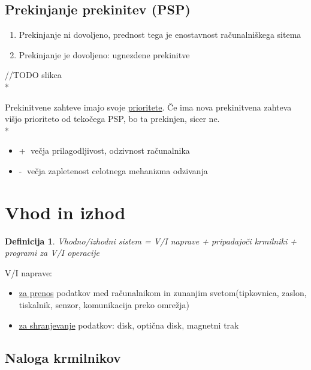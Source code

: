 \documentclass[
  slovene,
  a4paper
]{book}
\newtheorem*{df}{Definicija}
\begin{document}
\subsection{Prekinjanje prekinitev (PSP)}

\begin{enumerate}
  \item Prekinjanje ni dovoljeno, prednost tega je enostavnost računalniškega sitema
  \item Prekinjanje je dovoljeno: ugnezdene prekinitve
\end{enumerate}

//TODO slikca\\*

Prekinitvene zahteve imajo svoje \underline{prioritete}. Če ima nova prekinitvena zahteva višjo prioriteto od tekočega PSP, bo ta prekinjen, sicer ne.\\*

\begin{itemize}
  \item \textcircled{+} večja prilagodljivost, odzivnost računalnika
  \item \textcircled{-} večja zapletenost celotnega mehanizma odzivanja
\end{itemize}

\section{Vhod in izhod}

\begin{df}
  Vhodno/izhodni sistem = V/I naprave + pripadajoči krmilniki + programi za V/I operacije
\end{df}

V/I naprave:
\begin{itemize}
  \item \underline{za prenos} podatkov med računalnikom in zunanjim svetom(tipkovnica, zaslon, tiskalnik, senzor, komunikacija preko omrežja)
  \item \underline{za shranjevanje} podatkov: disk, optična disk, magnetni trak
\end{itemize}

\subsection{Naloga krmilnikov}
\end{document}
